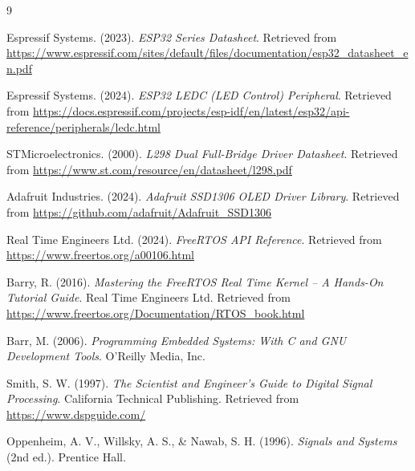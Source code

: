 \begin{thebibliography}{9}

    Espressif Systems. (2023). \textit{ESP32 Series Datasheet}.
    Retrieved from \url{https://www.espressif.com/sites/default/files/documentation/esp32_datasheet_en.pdf}

    Espressif Systems. (2024). \textit{ESP32 LEDC (LED Control) Peripheral}.
    Retrieved from \url{https://docs.espressif.com/projects/esp-idf/en/latest/esp32/api-reference/peripherals/ledc.html}

    STMicroelectronics. (2000). \textit{L298 Dual Full-Bridge Driver Datasheet}.
    Retrieved from \url{https://www.st.com/resource/en/datasheet/l298.pdf}

    Adafruit Industries. (2024). \textit{Adafruit SSD1306 OLED Driver Library}.
    Retrieved from \url{https://github.com/adafruit/Adafruit_SSD1306}

    Real Time Engineers Ltd. (2024). \textit{FreeRTOS API Reference}.
    Retrieved from \url{https://www.freertos.org/a00106.html}

    Barry, R. (2016). \textit{Mastering the FreeRTOS Real Time Kernel -- A Hands-On Tutorial Guide}.
    Real Time Engineers Ltd.
    Retrieved from \url{https://www.freertos.org/Documentation/RTOS_book.html}

    Barr, M. (2006). \textit{Programming Embedded Systems: With C and GNU Development Tools}.
    O'Reilly Media, Inc.

    Smith, S. W. (1997). \textit{The Scientist and Engineer's Guide to Digital Signal Processing}.
    California Technical Publishing.
    Retrieved from \url{https://www.dspguide.com/}

    Oppenheim, A. V., Willsky, A. S., \& Nawab, S. H. (1996). \textit{Signals and Systems}
    (2nd ed.). Prentice Hall.

\end{thebibliography}
